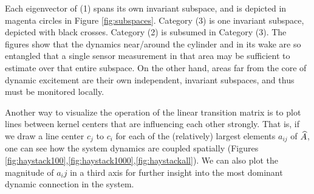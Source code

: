 Each eigenvector of (1) spans its own invariant subspace, and is depicted in magenta circles in Figure \ref{fig:subspaces}. Category (3) is one invariant subspace, depicted with black crosses. Category (2) is subsumed in Category (3). The figures show that the dynamics near/around the cylinder and in its wake are so entangled that a single sensor measurement in that area may be sufficient to estimate over that entire subspace. On the other hand, areas far from the core of dynamic excitement are their own independent, invariant subspaces, and thus must be monitored locally.

Another way to visualize the operation of the linear transition matrix is to plot lines between kernel centers that are influencing each other strongly. That is, if we draw a line center $c_j$ to $c_i$ for each of the (relatively) largest elements $a_{ij}$ of $\widehat{A}$, one can see how the system dynamics are coupled spatially (Figures \ref{fig:haystack100},\ref{fig:haystack1000},\ref{fig:haystackall}). We can also plot the magnitude of $a_ij$ in a third axis for further insight into the most dominant dynamic connection in the system.












